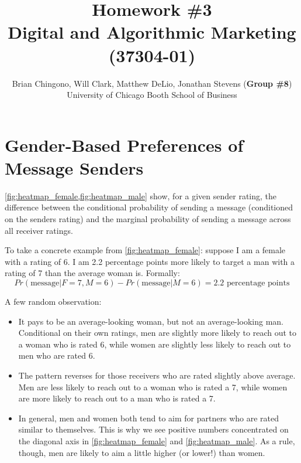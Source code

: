 



\title{Homework \#3\\
Digital and Algorithmic Marketing (37304-01)}
\author{
Brian Chingono, Will Clark, Matthew DeLio, Jonathan Stevens (\textbf{Group \#8})\\
University of Chicago Booth School of Business}

\maketitle

\section{Gender-Based Preferences of Message Senders}

\vref{fig:heatmap_female,fig:heatmap_male} show, for a given sender rating, the difference between the conditional probability of sending a message (conditioned on the senders rating) and the marginal probability of sending a message across all receiver ratings. 

To take a concrete example from \cref{fig:heatmap_female}: suppose I am a female with a rating of 6. I am 2.2 percentage points more likely to target a man with a rating of 7 than the average woman is. Formally:
\[ Pr(\text{message}|F=7,M=6) - Pr(\text{message}|M=6) = 2.2 \text{ percentage points}\]


A few random observation:
\begin{itemize}
\item It pays to be an average-looking woman, but not an average-looking man. Conditional on their own ratings, men are slightly more likely to reach out to a woman who is rated  6, while women are slightly less likely to reach out to men who are rated 6. 
\item The pattern reverses for those receivers who are rated slightly above average. Men are less likely to reach out to a woman who is rated a 7, while women are more likely to reach out to a man who is rated a 7.
\item In general, men and women both tend to aim for partners who are rated similar to themselves. This is why we see positive numbers concentrated on the diagonal axis in \cref{fig:heatmap_female} and \cref{fig:heatmap_male}. As a rule, though, men are likely to aim a little higher (or lower!) than women. 
\end{itemize}

